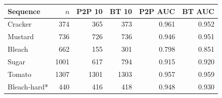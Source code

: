 \begin{tabular}{@{}lrrrrr@{}}
\toprule
Sequence & $n$ & P2P 10 & BT 10 & P2P AUC & BT AUC \\
\midrule
Cracker & 374 & 365 & 373 & 0.961 & 0.952 \\
Mustard & 736 & 726 & 736 & 0.946 & 0.951 \\
Bleach & 662 & 155 & 301 & 0.798 & 0.851 \\
Sugar & 1001 & 617 & 794 & 0.915 & 0.920 \\
Tomato & 1307 & 1301 & 1303 & 0.957 & 0.959 \\
Bleach-hard* & 440 & 416 & 418 & 0.948 & 0.930 \\
\bottomrule
\end{tabular}
